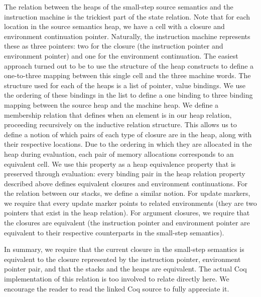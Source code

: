 The relation between the heaps of the small-step source semantics and the
instruction machine is the trickiest part of the state relation. Note that for
each location in the source semantics heap, we have a cell with a closure and
environment continuation pointer. Naturally, the instruction machine represents
these as three pointers: two for the closure (the instruction pointer and
environment pointer) and one for the environment continuation. The easiest
approach turned out to be to use the structure of the heap constructs to define a
one-to-three mapping between this single cell and the three machine words. The
structure used for each of the heaps is a list of pointer, value bindings.
We use the ordering of these bindings in the list to define a one binding to
three binding mapping between the source heap and the machine heap. We define 
a membership relation that defines when an element is in our heap relation,
proceeding recursively on the inductive relation structure. This allows us to
define a notion of which pairs of each type of closure are in the heap, along
with their respective locations. Due to the ordering in which they are allocated
in the heap during evaluation, each pair of memory allocations corresponds to an
equivalent cell. We use this property as a heap equivalence property that is
preserved through evaluation: every binding pair in the heap relation property
described above defines equivalent closures and environment continuations. For
the relation between our stacks, we define a similar notion.  For update
markers, we require that every update marker points to related environments
(they are two pointers that exist in the heap relation). For argument closures,
we require that the closures are equivalent (the instruction pointer and
environment pointer are equivalent to their respective counterparts in the
small-step semantics). 

In summary, we require that the current closure in the small-step semantics is
equivalent to the closure represented by the instruction pointer, environment
pointer pair, and that the stacks and the heaps are equivalent. The actual Coq
implementation of this relation is too involved to relate directly here. We
encourage the reader to read the linked Coq source to fully appreciate it.

